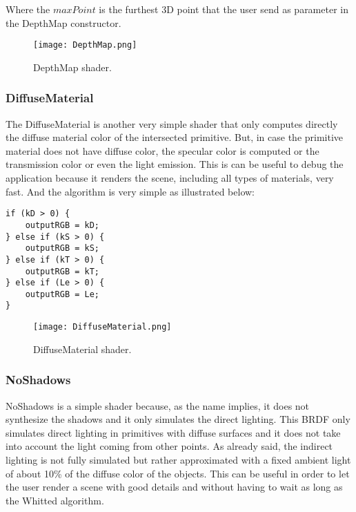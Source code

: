 Where the
$maxPoint$
is the furthest 3D point that the user send as parameter in the DepthMap constructor.

\begin{figure}[H]
	\centering
	\caption{DepthMap shader.}
	\label{DepthMap shader.}
	\texttt{[image: DepthMap.png]}
\end{figure}


\subsubsection{DiffuseMaterial}

\par
The DiffuseMaterial is another very simple shader that only computes directly the diffuse material color of the intersected primitive.
But, in case the primitive material does not have diffuse color, the specular color is computed or the transmission color or even the light emission.
This is can be useful to debug the application because it renders the scene, including all types of materials, very fast.
And the algorithm is very simple as illustrated below:

\begin{lstlisting}[caption={Algorithm of DiffuseMaterial Shader}, captionpos=b, label=DiffuseMaterial]
if (kD > 0) {
	outputRGB = kD;
} else if (kS > 0) {
	outputRGB = kS;
} else if (kT > 0) {
	outputRGB = kT;
} else if (Le > 0) {
	outputRGB = Le;
}
\end{lstlisting}

\begin{figure}[H]
	\centering
	\caption{DiffuseMaterial shader.}
	\label{DiffuseMaterial shader.}
	\texttt{[image: DiffuseMaterial.png]}
\end{figure}


\subsubsection{NoShadows}

\par
NoShadows is a simple shader because, as the name implies, it does not synthesize the shadows and it only simulates the direct lighting.
This BRDF only simulates direct lighting in primitives with diffuse surfaces and it does not take into account the light coming from other points.
As already said, the indirect lighting is not fully simulated but rather approximated with a fixed ambient light of about 10\% of the diffuse color of the objects.
This can be useful in order to let the user render a scene with good details and without having to wait as long as the Whitted algorithm.

